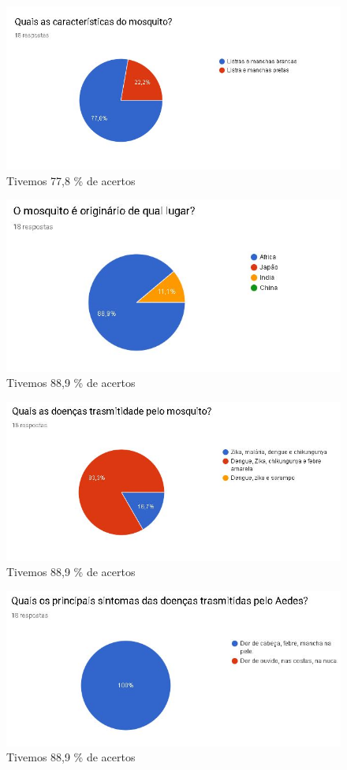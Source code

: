 \documentclass[12pt]{article}
\begin{document}
	\begin{figure}[H]
		\centering
		\caption{Tivemos 77,8 \% de acertos}
		\includegraphics[width=0.7\linewidth]{Figuras/Pergunta_1}
		
		\label{fig:pergunta1}
	\end{figure}
	
	\begin{figure}[H]
		\centering
		\caption{Tivemos 88,9 \% de acertos}
		\includegraphics[width=0.7\linewidth]{Figuras/Pergunta_2}
		
		\label{fig:pergunta2}
	\end{figure}
	
	\begin{figure}[H]
		\centering
		\caption{Tivemos 88,9 \% de acertos}
		\includegraphics[width=0.7\linewidth]{Figuras/Pergunta_3}
		
		\label{fig:pergunta3}
	\end{figure}
	
	\begin{figure}[H]
		\centering
		\caption{Tivemos 88,9 \% de acertos}
		\includegraphics[width=0.7\linewidth]{Figuras/Pergunta_4}
		
		\label{fig:pergunta4}
	\end{figure}
	
\end{document}
